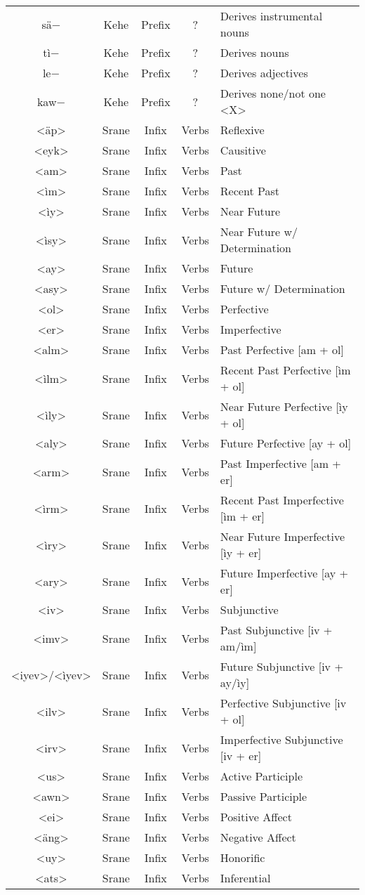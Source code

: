 \begin{center}
\begin{longtable}[c]{|c c c c l|}
{sä$-$} & Kehe & Prefix & ? & Derives instrumental nouns\\
{tì$-$} & Kehe & Prefix & ? & Derives nouns\\
{le$-$} & Kehe & Prefix & ? & Derives adjectives\\
{kaw$-$} & Kehe & Prefix & ? & Derives none/not one <X>\\
{<äp>} & Srane & Infix & Verbs & Reflexive\\
{<eyk>} & Srane & Infix & Verbs & Causitive\\
{<am>} & Srane & Infix & Verbs & Past\\
{<ìm>} & Srane & Infix & Verbs & Recent Past\\
{<ìy>} & Srane & Infix & Verbs & Near Future\\
{<ìsy>} & Srane & Infix & Verbs & Near Future w/ Determination\\
{<ay>} & Srane & Infix & Verbs & Future\\
{<asy>} & Srane & Infix & Verbs & Future w/ Determination\\
{<ol>} & Srane & Infix & Verbs & Perfective\\
{<er>} & Srane & Infix & Verbs & Imperfective\\
{<alm>} & Srane & Infix & Verbs & Past Perfective [am + ol]\\
{<ìlm>} & Srane & Infix & Verbs & Recent Past Perfective [ìm + ol]\\
{<ìly>} & Srane & Infix & Verbs & Near Future Perfective [ìy + ol]\\
{<aly>} & Srane & Infix & Verbs & Future Perfective [ay + ol]\\
{<arm>} & Srane & Infix & Verbs & Past Imperfective [am + er]\\
{<ìrm>} & Srane & Infix & Verbs & Recent Past Imperfective [ìm + er]\\
{<ìry>} & Srane & Infix & Verbs & Near Future Imperfective [ìy + er]\\
{<ary>} & Srane & Infix & Verbs & Future Imperfective [ay + er]\\
{<iv>} & Srane & Infix & Verbs & Subjunctive\\
{<imv>} & Srane & Infix & Verbs & Past Subjunctive [iv + am/ìm]\\
{<iyev>/<ìyev>} & Srane & Infix & Verbs & Future Subjunctive [iv + ay/ìy]\\
{<ilv>} & Srane & Infix & Verbs & Perfective Subjunctive [iv + ol]\\
{<irv>} & Srane & Infix & Verbs & Imperfective Subjunctive [iv + er]\\
{<us>} & Srane & Infix & Verbs & Active Participle\\
{<awn>} & Srane & Infix & Verbs & Passive Participle\\
{<ei>} & Srane & Infix & Verbs & Positive Affect\\
{<äng>} & Srane & Infix & Verbs & Negative Affect\\
{<uy>} & Srane & Infix & Verbs & Honorific\\
{<ats>} & Srane & Infix & Verbs & Inferential\\
\end{longtable}
\end{center}